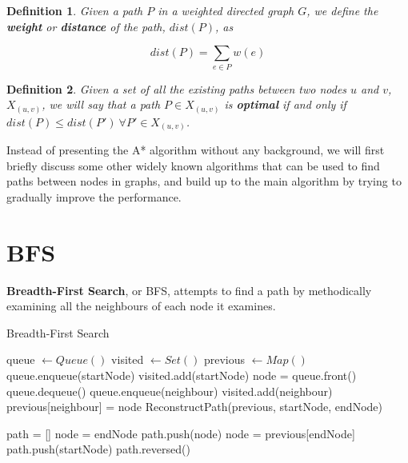 \documentclass[12pt]{report}
\newtheorem{mydef}{Definition}
\begin{document}
\begin{mydef}
Given a path $P$ in a weighted directed graph $G$, we define the \textbf{weight} or \textbf{distance} of the path, $dist(P)$, as

\[ dist(P) = \sum_{e \in P} w(e) \]

\end{mydef}

\begin{mydef}
Given a set of all the existing paths between two nodes $u$ and $v$, $X_{(u, v)}$, we will say that a path $P \in X_{(u,v)}$ is \textbf{optimal} if and only if $dist(P) \le dist(P') \ \forall P' \in X_{(u, v)}$.
\end{mydef}

Instead of presenting the A* algorithm without any background, we will first briefly discuss some other widely known algorithms that can be used to find paths between nodes in graphs, and build up to the main algorithm by trying to gradually improve the performance.



\section{BFS}
\textbf{Breadth-First Search}, or BFS, attempts to find a path by methodically examining all the neighbours of each node it examines.

\begin{algorithm}
\caption{Breadth-First Search}
\begin{algorithmic}[1]
\State queue $\gets Queue()$
\State visited $\gets Set()$
\State previous $\gets Map()$
\State queue.enqueue(startNode)
\State visited.add(startNode)
	\State node = queue.front()
	\State queue.dequeue()
			\State queue.enqueue(neighbour)
			\State visited.add(neighbour)
			\State previous[neighbour] = node
		\EndIf
	\EndFor
\EndWhile
\State \Return ReconstructPath(previous, startNode, endNode)
\EndProcedure

\Statex

\State path = []  
\State node = endNode
	\State path.push(node)
	\State node = previous[endNode]
\EndWhile
\State path.push(startNode)
\State \Return path.reversed()
\EndProcedure
\end{algorithmic}
\end{algorithm}
\end{document}
